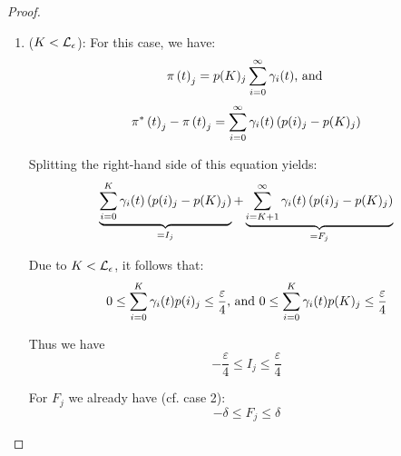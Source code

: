 \documentclass{entcs}
\begin{document}
{\begin{proof}
\begin{enumerate}
						and because of the fact that probabilities $\pij$ are not decreasing, due to the initial condition $\forall j \in \Ind : P(j,j) = 1$:
						\begin{equation}
							- \delta \leq \sum_{i=K+1}^{\infty}\giqt (\pij - \ppj) \leq 0 \nonumber
						\end{equation}
	
						Thus:
						\begin{equation}
								- \delta \leq F_{j} \leq \delta \nonumber
						\end{equation}
						
						By gathering all results, we obtain:
						\begin{equation}
								\left| \piptj - \pitj \right| \leq \delta + \frac{3}{4} \varepsilon \nonumber
						\end{equation}
	
					\item ($K < \mathcal{L}_{\epsilon}$): For this case, we have:
						\begin{equation}
							\pi \left( t \right)_{j} = p(K)_{j} \sum_{i=0}^{\infty} \gamma_{i}(t) \text{, and } \nonumber
						\end{equation}
						\begin{equation}
							\pi^{*} \left( t \right)_{j} - \pi \left( t \right)_{j} = \sum_{i=0}^{\infty} \gamma_{i}(t) \left( p(i)_{j} - p(K)_{j} \right) \nonumber
						\end{equation}
		
						Splitting the right-hand side of this equation yields:
						\begin{equation}
							\underbrace{\sum_{i=0}^{K} \gamma_{i}(t) \left( p(i)_{j} - p(K)_{j} \right)}_{ = I_{j}} + \underbrace{\sum_{i=K+1}^{\infty} \gamma_{i}(t) \left( p(i)_{j} - p(K)_{j} \right)}_{ = F_{j}} \nonumber
						\end{equation}
	
						Due to $K < \mathcal{L}_{\epsilon}$, it follows that:
						\begin{equation}
							0 \leq \sum_{i=0}^{K} \gamma_{i}(t) p(i)_{j} \leq \frac{\varepsilon}{4} \text{, and } 0 \leq \sum_{i=0}^{K} \gamma_{i}(t) p(K)_{j} \leq \frac{\varepsilon}{4} \nonumber
						\end{equation}
						
						Thus we have
						\begin{equation}
							- \frac{\varepsilon}{4} \leq I_{j} \leq \frac{\varepsilon}{4} \nonumber
						\end{equation}
						
						For $F_{j}$ we already have (cf. case 2):
						\begin{equation}
							- \delta \leq F_{j} \leq \delta \nonumber
						\end{equation}
						

\end{enumerate}
\end{proof}}
\end{document}
